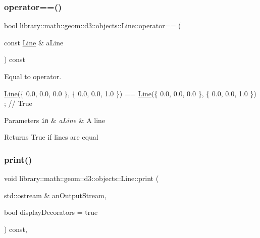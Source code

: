 \subsubsection{\texorpdfstring{operator==()}{operator==()}}
{\footnotesize\ttfamily bool library\+::math\+::geom\+::d3\+::objects\+::\+Line\+::operator== (\begin{DoxyParamCaption}\item[{const \hyperlink{classlibrary_1_1math_1_1geom_1_1d3_1_1objects_1_1_line}{Line} \&}]{a\+Line }\end{DoxyParamCaption}) const}



Equal to operator. 


\begin{DoxyCode}
\hyperlink{classlibrary_1_1math_1_1geom_1_1d3_1_1objects_1_1_line_a762e529453ff9ffa9233fd73737f4692}{Line}(\{ 0.0, 0.0, 0.0 \}, \{ 0.0, 0.0, 1.0 \}) == \hyperlink{classlibrary_1_1math_1_1geom_1_1d3_1_1objects_1_1_line_a762e529453ff9ffa9233fd73737f4692}{Line}(\{ 0.0, 0.0, 0.0 \}, \{ 0.0, 0.0, 1.0 \}) ; \textcolor{comment}{// True}
\end{DoxyCode}



\begin{DoxyParams}[1]{Parameters}
\mbox{\tt in}  & {\em a\+Line} & A line \\
\hline
\end{DoxyParams}
\begin{DoxyReturn}{Returns}
True if lines are equal 
\end{DoxyReturn}
\mbox{\label{classlibrary_1_1math_1_1geom_1_1d3_1_1objects_1_1_line_a6c2d2268fed2b9c461730fbcd4425d6e}} 
\subsubsection{\texorpdfstring{print()}{print()}}
{\footnotesize\ttfamily void library\+::math\+::geom\+::d3\+::objects\+::\+Line\+::print (\begin{DoxyParamCaption}\item[{std\+::ostream \&}]{an\+Output\+Stream,  }\item[{bool}]{display\+Decorators = {\ttfamily true} }\end{DoxyParamCaption}) const\hspace{0.3cm}{\ttfamily [override]}, {\ttfamily [virtual]}}



